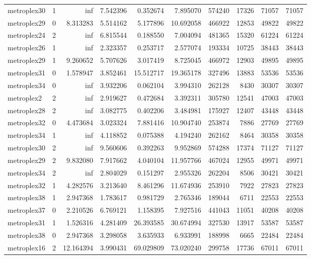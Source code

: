 \begin{longtable}{|l|r|r|r|r|r|r|r|r|r|}
metroplex30 & 1 & inf & 7.542396 & 0.352674 & 7.895070 & 574240 & 17326 & 71057 & 71057 \\
metroplex29 & 0 & 8.313283 & 5.514162 & 5.177896 & 10.692058 & 466922 & 12853 & 49822 & 49822 \\
metroplex24 & 2 & inf & 6.815544 & 0.188550 & 7.004094 & 481365 & 15320 & 61224 & 61224 \\
metroplex26 & 1 & inf & 2.323357 & 0.253717 & 2.577074 & 193334 & 10725 & 38443 & 38443 \\
metroplex29 & 1 & 9.260652 & 5.707626 & 3.017419 & 8.725045 & 466972 & 12903 & 49895 & 49895 \\
metroplex31 & 0 & 1.578947 & 3.852461 & 15.512717 & 19.365178 & 327496 & 13883 & 53536 & 53536 \\
metroplex34 & 0 & inf & 3.932206 & 0.062104 & 3.994310 & 262128 & 8430 & 30307 & 30307 \\
metroplex2 & 2 & inf & 2.919627 & 0.472684 & 3.392311 & 305780 & 12541 & 47003 & 47003 \\
metroplex28 & 2 & inf & 3.082775 & 0.402206 & 3.484981 & 175927 & 12407 & 43448 & 43448 \\
metroplex32 & 0 & 4.473684 & 3.023324 & 7.881416 & 10.904740 & 253874 & 7886 & 27769 & 27769 \\
metroplex34 & 1 & inf & 4.118852 & 0.075388 & 4.194240 & 262162 & 8464 & 30358 & 30358 \\
metroplex30 & 2 & inf & 9.560606 & 0.392263 & 9.952869 & 574288 & 17374 & 71127 & 71127 \\
metroplex29 & 2 & 9.832080 & 7.917662 & 4.040104 & 11.957766 & 467024 & 12955 & 49971 & 49971 \\
metroplex34 & 2 & inf & 2.804029 & 0.151297 & 2.955326 & 262204 & 8506 & 30421 & 30421 \\
metroplex32 & 1 & 4.282576 & 3.213640 & 8.461296 & 11.674936 & 253910 & 7922 & 27823 & 27823 \\
metroplex38 & 1 & 2.947368 & 1.783617 & 0.981729 & 2.765346 & 189044 & 6711 & 22553 & 22553 \\
metroplex37 & 0 & 2.210526 & 6.769121 & 1.158395 & 7.927516 & 441043 & 11051 & 40208 & 40208 \\
metroplex31 & 1 & 1.526316 & 4.281409 & 26.393585 & 30.674994 & 327530 & 13917 & 53587 & 53587 \\
metroplex38 & 0 & 2.947368 & 3.298058 & 3.635933 & 6.933991 & 188998 & 6665 & 22484 & 22484 \\
metroplex16 & 2 & 12.164394 & 3.990431 & 69.029809 & 73.020240 & 299758 & 17736 & 67011 & 67011 \\

\end{longtable}
